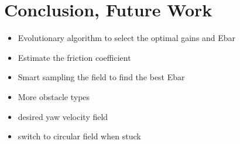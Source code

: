\section{Conclusion, Future Work}
\begin{itemize}
    \item Evolutionary algorithm to select the optimal gains and Ebar
    \item Estimate the friction coefficient
    \item Smart sampling the field to find the best Ebar
    \item More obstacle types
    \item desired yaw velocity field 
    \item switch to circular field when stuck
\end{itemize}